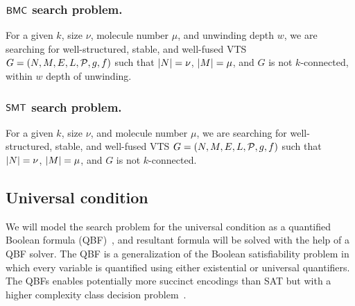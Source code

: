 \subsubsection{$\mathsf{BMC}$ search problem.}
For a given $k$, size $\nu$, molecule number $\mu$, and unwinding depth $w$,
we are searching for well-structured, stable, and well-fused VTS
$G = (N,M,E,L,\mathcal{P},g,f)$ such that
$|N| = \nu$, $|M| = \mu$, and $G$ is not $k$-connected, within $w$ depth of unwinding.    

\subsubsection{$\mathsf{SMT}$ search problem.}
For a given $k$, size $\nu$, and molecule number $\mu$,
we are searching for well-structured, stable, and well-fused VTS
$G = (N,M,E,L,\mathcal{P},g,f)$ such that
$|N| = \nu$, $|M| = \mu$, and
$G$ is not $k$-connected.    

%
%
%
%

\subsection{Universal condition}
We will model the search problem for the universal condition as a quantified Boolean formula (QBF)~\cite{buning2009theory, benedetti2008qbf}, and resultant formula will be solved with the help of a QBF solver.
%
The QBF is a generalization of the Boolean satisfiability problem in which every variable is quantified using either existential or universal quantifiers.
%
The QBFs enables potentially more succinct encodings than SAT but with a higher complexity class decision problem~\cite{buning2009theory}.
 
